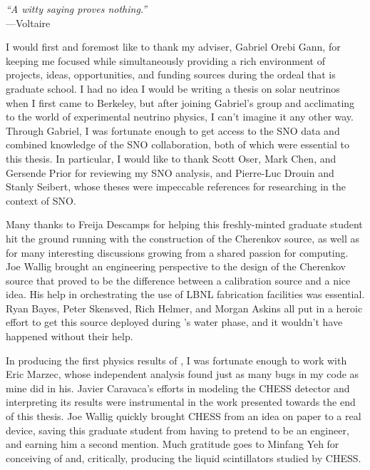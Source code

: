 \documentclass[12pt,letterpaper,oldfontcommands]{ucbthesis}
\begin{document}
\begin{frontmatter}

\begin{dedication}
\null\vfil
\begin{center}
\textit{``A witty saying proves nothing.''} \\
\hspace{100pt}---Voltaire
\end{center}
\vfil\null
\end{dedication}

\tableofcontents
\clearpage
\listoffigures
\clearpage
\listoftables
\clearpage


\begin{acknowledgements}

I would first and foremost like to thank my adviser, Gabriel Orebi Gann, for keeping me focused while simultaneously providing a rich environment of projects, ideas, opportunities, and funding sources during the ordeal that is graduate school. 
I had no idea I would be writing a thesis on solar neutrinos when I first came to Berkeley, but after joining Gabriel's group and acclimating to the world of experimental neutrino physics, I can't imagine it any other way.
Through Gabriel, I was fortunate enough to get access to the SNO data and combined knowledge of the SNO collaboration, both of which were essential to this thesis.
In particular, I would like to thank Scott Oser, Mark Chen, and Gersende Prior for reviewing my SNO analysis, and Pierre-Luc Drouin and Stanly Seibert, whose theses were impeccable references for researching in the context of SNO.

Many thanks to Freija Descamps for helping this freshly-minted graduate student hit the ground running with the construction of the Cherenkov source, as well as for many interesting discussions growing from a shared passion for computing.
Joe Wallig brought an engineering perspective to the design of the Cherenkov source that proved to be the difference between a calibration source and a nice idea.
His help in orchestrating the use of LBNL fabrication facilities was essential.
Ryan Bayes, Peter Skensved, Rich Helmer, and Morgan Askins all put in a heroic effort to get this source deployed during {\snop}'s water phase, and it wouldn't have happened without their help.

In producing the first physics results of {\snop}, I was fortunate enough to work with Eric Marzec, whose independent analysis found just as many bugs in my code as mine did in his.
Javier Caravaca's efforts in modeling the CHESS detector and interpreting its results were instrumental in the work presented towards the end of this thesis.
Joe Wallig quickly brought CHESS from an idea on paper to a real device, saving this graduate student from having to pretend to be an engineer, and earning him a second mention.
Much gratitude goes to Minfang Yeh for conceiving of and, critically, producing the liquid scintillators studied by CHESS. 


\end{acknowledgements}
\end{frontmatter}
\end{document}
